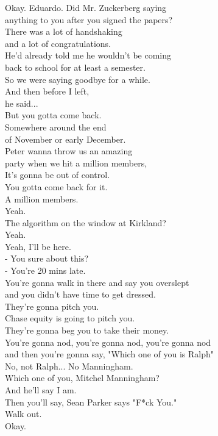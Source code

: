 \documentclass{article}
\begin{document}
\begin{multicols}{3}
Okay. Eduardo. Did Mr. Zuckerberg saying\\
anything to you after you signed the papers?\\
There was a lot of handshaking\\
and a lot of congratulations.\\
He'd already told me he wouldn't be coming\\
back to school for at least a semester.\\
So we were saying goodbye for a while.\\
And then before I left,\\
he said...\\
But you gotta come back.\\
Somewhere around the end\\
of November or early December.\\
Peter wanna throw us an amazing\\
party when we hit a million members,\\
It's gonna be out of control.\\
You gotta come back for it.\\
A million members.\\
Yeah.\\
The algorithm on the window at Kirkland?\\
Yeah.\\
Yeah, I'll be here.\\
- You sure about this?\\
- You're 20 mins late.\\
You're gonna walk in there and say you overslept\\
and you didn't have time to get dressed.\\
They're gonna pitch you.\\
Chase equity is going to pitch you.\\
They're gonna beg you to take their money.\\
You're gonna nod, you're gonna nod, you're gonna nod\\
and then you're gonna say, "Which one of you is Ralph"\\
No, not Ralph... No Manningham.\\
Which one of you, Mitchel Manningham?\\
And he'll say I am.\\
Then you'll say, Sean Parker says "F*ck You."\\
Walk out.\\
Okay.\\

\end{multicols}
\end{document}
